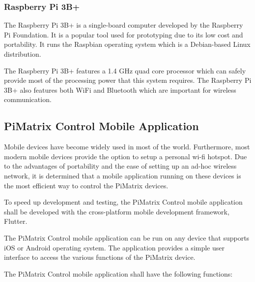 \documentclass[hidelinks,12pt]{report} %
\begin{document}
\subsubsection{Raspberry Pi 3B+}

The Raspberry Pi 3B+ is a single-board computer developed by the Raspberry Pi Foundation. It is a popular tool used for prototyping due to its low cost and portability. It runs the Raspbian operating system which is a Debian-based Linux distribution. 

The Raspberry Pi 3B+ features a 1.4 GHz quad core processor which can safely provide most of the processing power that this system requires. The Raspberry Pi 3B+ also features both WiFi and Bluetooth which are important for wireless communication.

\subsection{PiMatrix Control Mobile Application}

Mobile devices have become widely used in most of the world. Furthermore, most modern mobile devices provide the option to setup a personal wi-fi hotspot. Due to the advantages of portability and the ease of setting up an ad-hoc wireless network, it is determined that a mobile application running on these devices is the most efficient way to control the PiMatrix devices. 

To speed up development and testing, the PiMatrix Control mobile application shall be developed with the cross-platform mobile development framework, Flutter\cite{26}.  

The PiMatrix Control mobile application can be run on any device that supports iOS or Android operating system. The application provides a simple user interface to access the various functions of the PiMatrix device.   

The PiMatrix Control mobile application shall have the following functions:
\end{document}
